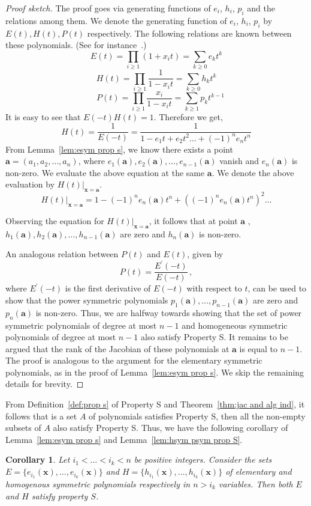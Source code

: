 \documentclass[10pt,a4paper]{article}
\newtheorem{corollary}[theorem]{Corollary}
\theoremstyle{definition}
\newcommand{\va}{\mathbf a}
\newcommand{\vx}{\mathbf x}
\begin{document}
\begin{proof}[Proof sketch]
	The proof goes via  generating functions of $e_i$, $h_i$, $p_i$ and the relations among them. We denote the generating function of $e_i$, $h_i$, $p_i$ by $E(t),H(t),P(t)$ respectively. The following relations are known between these polynomials. (See for instance~\cite{r28}.)
	$$E(t)= \prod_{i \geq 1} (1+x_it)=\sum_{k \geq 0} e_kt^k$$ 
	$$H(t)=\prod_{i \geq 1} \frac{1}{1-x_it}=\sum_{k \geq 0}  h_kt^k$$
	\quad $$ \quad P(t)=\prod_{i\geq 1}\frac{x_i}{1-x_it}= \sum_{k \geq 1}  p_kt^{k-1}$$
It is easy to see that $E(-t)H(t)=1$.  Therefore we get, 
\begin{equation} \label{equ: h to e gen fun}
H(t)= \frac{1}{E(-t)} =\frac{1}{1-e_1t+e_2t^2 \ldots +(-1)^ne_nt^n}
\end{equation}
From Lemma~\ref{lem:esym prop s}, we know there exists a point $\va=(a_1, a_2, \ldots, a_n)$, where $e_1(\va), e_2(\va), \ldots, e_{n-1}(\va)$ vanish and $e_n(\va)$ is non-zero. We evaluate the above equation at the same $\va$. We denote the above evaluation by $H(t)|_{\vx=\va}$.
$$H(t)|_{\vx=\va}=1- (-1)^ne_n(\va)t^n +((-1)^ne_n(\va)t^n)^2 \ldots $$ 
	
Observing the equation for $H(t)|_{\vx=\va}$, it follows that at point $\va$ , $h_1(\va), h_2(\va), \ldots, h_{n-1}(\va)$ are zero and $h_n(\va)$ is non-zero. %
	
An analogous relation between $P(t)$ and $E(t)$, given by
	  \[
	  P(t)=\frac{E^\prime(-t)}{E(-t)} \, ,
	  \] 
where $E^\prime(-t)$ is the first derivative of $E(-t)$ with respect to $t$, can be used to show that the power symmetric polynomials $p_1(\va),\ldots, p_{n-1}(\va)$ are zero and  $p_n(\va)$ is non-zero. 
%
Thus, we are halfway towards showing that the set of power symmetric polynomials of degree at most $n-1$ and homogeneous symmetric polynomials of degree at most $n-1$ also satisfy Property S. It remains to be argued that the rank of the Jacobian of these polynomials at $\va$ is equal to $n-1$. The proof is analogous to the argument for the elementary symmetric polynomials, as in the proof of Lemma~\ref{lem:esym prop s}. We skip the remaining details for brevity. 
\end{proof}
From Definition~\ref{def:prop s} of Property S and Theorem~\ref{thm:jac and alg ind}, it follows that is a set $A$ of polynomials satisfies Property S, then all the non-empty subsets of $A$ also satisfy Property S. Thus, we have the following corollary of Lemma~\ref{lem:esym prop s} and Lemma~\ref{lem:hsym psym prop S}.
\begin{corollary}\label{cor:prop s subsets}
Let $i_1 < \dots < i_k < n$ be positive integers. Consider the sets $E = \{e_{i_1}(\vx), \dots, e_{i_k}(\vx)\}$ and $H = \{h_{i_1}(\vx), \dots, h_{i_k}(\vx)\}$ of elementary and homogenous symmetric polynomials respectively in $n > i_k$ variables. Then both $E$ and $H$ satisfy property $S$. 
\end{corollary}
\end{document}
